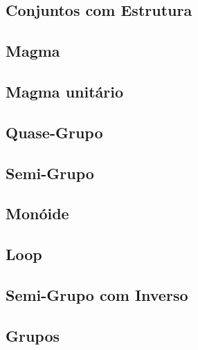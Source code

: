 \documentclass[twoside]{amsart}
\numberwithin{equation}{section}
\begin{document}
\begin{refsection}
\section{Conjuntos com Estrutura}

\subsection{Magma}

\subsection{Magma unitário}

\subsection{Quase-Grupo}

\subsection{Semi-Grupo}

\subsection{Monóide}

\subsection{Loop}

\subsection{Semi-Grupo com Inverso}

\printbibliography[heading=subbibliography]
\end{refsection}


\begin{refsection}
\section{Grupos}

\printbibliography[heading=subbibliography]
\end{refsection}

\end{document}
